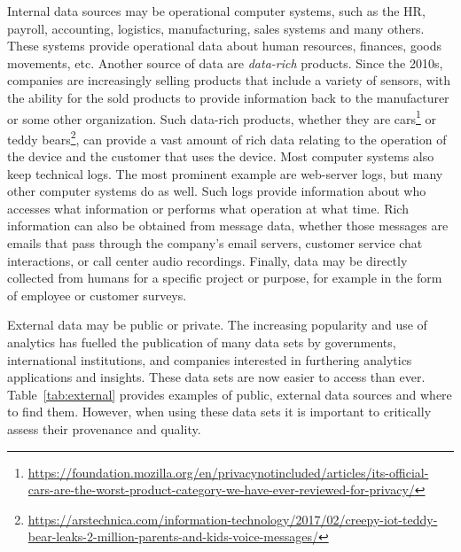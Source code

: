 Internal data sources may be operational computer systems, such as the HR, payroll, accounting, logistics, manufacturing, sales systems and many others. These systems provide operational data about human resources, finances, goods movements, etc. Another source of data are \emph{data-rich} products. Since the 2010s, companies are increasingly selling products that include a variety of sensors, with the ability for the sold products to provide information back to the manufacturer or some other organization. Such data-rich products, whether they are cars\footnote{\scriptsize \url{https://foundation.mozilla.org/en/privacynotincluded/articles/its-official-cars-are-the-worst-product-category-we-have-ever-reviewed-for-privacy/}} or teddy bears\footnote{\scriptsize \url{https://arstechnica.com/information-technology/2017/02/creepy-iot-teddy-bear-leaks-2-million-parents-and-kids-voice-messages/}}, can provide a vast amount of rich data relating to the operation of the device and the customer that uses the device. Most computer systems also keep technical logs. The most prominent example are web-server logs, but many other computer systems do as well. Such logs provide information about who accesses what information or performs what operation at what time. Rich information can also be obtained from message data, whether those messages are emails that pass through the company's email servers, customer service chat interactions, or call center audio recordings. Finally, data may be directly collected from humans for a specific project or purpose, for example in the form of employee or customer surveys. 

External data may be public or private. The increasing popularity and use of analytics has fuelled the publication of many data sets by governments, international institutions, and companies interested in furthering analytics applications and insights. These data sets are now easier to access than ever. Table~\ref{tab:external} provides examples of public, external data sources and where to find them. However, when using these data sets it is important to critically assess their provenance and quality.

